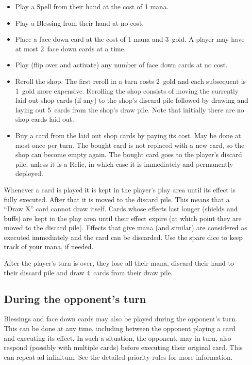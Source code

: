 \documentclass[dvipsnames,parskip,a4paper]{scrartcl}
\newcommand{\facedowncost}{3}
\newcommand{\rerollcost}{2}
\newcommand{\rerollcostincrease}{1}
\newcommand{\handsize}{4}
\newcommand{\dacedownsize}{2}
\newcommand{\shopsize}{5}
\begin{document}
\begin{itemize}
\item Play a Spell from their hand at the cost of 1 mana.
\item Play a Blessing from their hand at no cost.
\item Place a face down card at the cost of 1 mana and \facedowncost \ gold. A player may have at most \dacedownsize \ face down cards at a time.
\item Play (flip over and activate) any number of face down cards at no cost.
\item Reroll the shop. The first reroll in a turn costs \rerollcost \ gold and each subsequent is \rerollcostincrease \ gold more expensive.
Rerolling the shop consists of moving the currently laid out shop cards (if any) to the shop's discard pile followed by drawing and laying out \shopsize \ cards from the shop's draw pile. Note that initially there are no shop cards laid out.
\item Buy a card from the laid out shop cards by paying its cost. May be done at most once per turn.
The bought card is not replaced with a new card, so the shop can become empty again. The bought card goes to the player's discard pile, unless it is a Relic, in which case it is immediately and permanently deployed.
\end{itemize}

Whenever a card is played it is kept in the player's play area until its effect is fully executed. After that it is moved to the discard pile. This means that a ``Draw X'' card cannot draw itself. Cards whose effects last longer (shields and buffs) are kept in the play area until their effect expire (at which point they are moved to the discard pile). Effects that give mana (and similar) are considered as executed immediately and the card can be discarded. Use the spare dice to keep track of your mana, if needed.

\vspace{4pt}

After the player's turn is over, they lose all their mana, discard their hand to their discard pile and draw \handsize \ cards from their draw pile.

\subsection*{During the opponent's turn}

Blessings and face down cards may also be played during the opponent's turn. This can be done at any time, including between the opponent playing a card and executing its effect. In such a situation, the opponent, may in turn, also respond (possibly with multiple cards) before executing their original card. This can repeat ad infinitum. See the detailed priority rules for more information.
\end{document}
